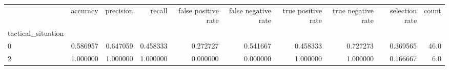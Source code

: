 \begin{tabular}{lrrrrrrrrr}
\toprule
{} &  accuracy &  precision &    recall &  false positive rate &  false negative rate &  true positive rate &  true negative rate &  selection rate &  count \\
tactical\_situation &           &            &           &                      &                      &                     &                     &                 &        \\
\midrule
0                  &  0.586957 &   0.647059 &  0.458333 &             0.272727 &             0.541667 &            0.458333 &            0.727273 &        0.369565 &   46.0 \\
2                  &  1.000000 &   1.000000 &  1.000000 &             0.000000 &             0.000000 &            1.000000 &            1.000000 &        0.166667 &    6.0 \\
\bottomrule
\end{tabular}
